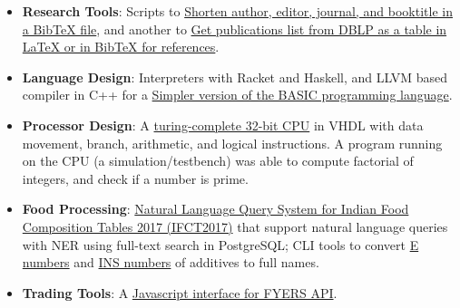 \begin{itemize}[noitemsep, leftmargin=*]
  \item \textbf{Research Tools}:
    Scripts to \href{https://github.com/javascriptf/script-minify-bibtex}{Shorten author, editor, journal, and booktitle in a BibTeX file},
    and another to \href{https://github.com/javascriptf/script-publications-list}{Get publications list from DBLP as a table in LaTeX or in BibTeX for references}.
  \item \textbf{Language Design}:
    Interpreters with Racket and Haskell, and
    LLVM based compiler in C++ for a \href{https://github.com/compilerz/basic}{Simpler version of the BASIC programming language}.
  \item \textbf{Processor Design}:
    A \href{https://github.com/vhdlf/cpu_basic}{turing-complete 32-bit CPU} in VHDL with data movement, branch, arithmetic, and logical instructions. A program running on the CPU (a simulation/testbench) was able to compute factorial of integers, and check if a number is prime.
  \item \textbf{Food Processing}:
    \href{https://ifct2017.github.io}{Natural Language Query System for Indian Food Composition Tables 2017 (IFCT2017)} that support natural language queries with NER using full-text search in PostgreSQL;
    CLI tools to convert \href{https://github.com/nodef/food-e}{E numbers} and \href{https://github.com/nodef/food-ins}{INS numbers} of additives to full names.
  \item \textbf{Trading Tools}:
    A \href{https://github.com/nodef/extra-fyers}{Javascript interface for FYERS API}.

\end{itemize}

